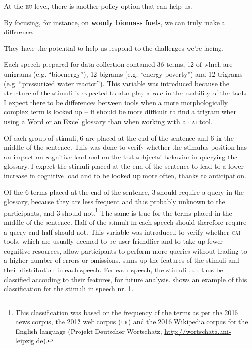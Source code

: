 \documentclass[output=paper]{langsci/langscibook}
\begin{document}
At the \textsc{eu} level, there is another policy option that can help us.

By focusing, for instance, on \textbf{woody biomass fuels}, we can truly make a difference.

They have the potential to help us respond to the challenges we’re facing.
\z

Each speech prepared for data collection contained 36 terms, 12 of which are unigrams (e.g. ``bioenergy''), 12 bigrams (e.g. ``energy poverty'') and 12 trigrams (e.g. ``pressurized water reactor''). This variable was introduced because the structure of the stimuli is expected to also play a role in the usability of the tools. I expect there to be differences between tools when a more morphologically complex term is looked up – it should be more difficult to find a trigram when using a Word or an Excel glossary than when working with a \textsc{cai} tool. 

Of each group of stimuli, 6 are placed at the end of the sentence and 6 in the middle of the sentence. This was done to verify whether the stimulus position has an impact on cognitive load and on the test subjects’ behavior in querying the glossary. I expect the stimuli placed at the end of the sentence to lead to a lower increase in cognitive load and to be looked up more often, thanks to anticipation. 

Of the 6 terms placed at the end of the sentence, 3 should require a query in the glossary, because they are less frequent and thus probably unknown to the participants, and 3 should not.\footnote{This classification was based on the frequency of the terms as per the 2015 news corpus, the 2012 web corpus (\textsc{uk}) and the 2016 Wikipedia corpus for the English language (Projekt Deutscher Wortschatz, \url{http://wortschatz.uni-leipzig.de}).} The same is true for the terms placed in the middle of the sentence. Half of the stimuli in each speech should therefore require a query and half should not. This variable was introduced to verify whether \textsc{cai} tools, which are usually deemed to be user-friendlier and to take up fewer cognitive resources, allow participants to perform more queries without leading to a higher number of errors or omissions.  sums up the features of the stimuli and their distribution in each speech. For each speech, the stimuli can thus be classified according to their features, for future analysis.  shows an example of this classification for the stimuli in speech nr. 1.
\end{document}
